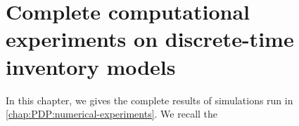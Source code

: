 \chapter{Complete computational experiments on discrete-time inventory models}
\label{chap:appendix:pdp:numerical-experiments}


In this chapter, we gives the complete results of simulations run in \cref{chap:PDP:numerical-experiments}.
We recall the 



\newpage

%





\newpage
